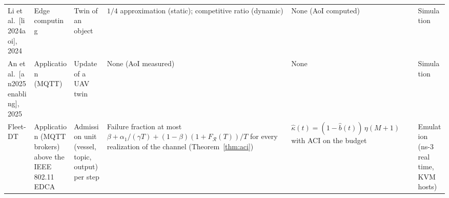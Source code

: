 \begin{table}[t]
\begin{tabularx}{\textwidth}{@{}p{3.0cm}p{2.3cm}p{2.5cm}XXp{2.6cm}@{}}
Li et al.\ [li2024aoi], 2024 & Edge computing & Twin of an object & $1/4$ approximation (static); competitive ratio (dynamic) & None (AoI computed) & Simulation \\
An et al.\ [an2025enabling], 2025 & Application (MQTT) & Update of a UAV twin & None (AoI measured) & None & Simulation \\
\midrule
Fleet-DT & Application (MQTT brokers) above the IEEE 802.11 EDCA & Admission unit (vessel, topic, output) per step & Failure fraction at most $\beta + \alpha_1/(\gamma T) + (1-\beta)(1 + F_{\mathcal{R}}(T))/T$ for every realization of the channel (Theorem~\ref{thm:aci}) & $\hat{\kappa}(t) = (1 - \hat{b}(t))\,\eta(M+1)$ with ACI on the budget & Emulation (ns-3 real time, KVM hosts) \\
\bottomrule
\end{tabularx}
\end{table}
